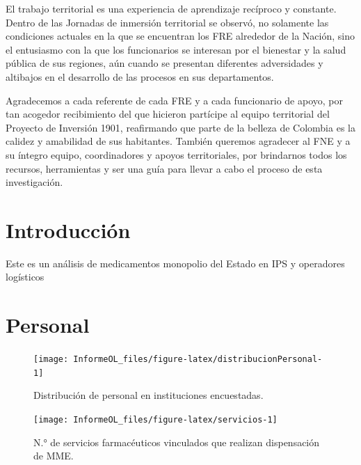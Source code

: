 \documentclass[
  oneside]{book}
\begin{document}
El trabajo territorial es una experiencia de aprendizaje recíproco y constante. Dentro de las Jornadas de inmersión territorial se observó, no solamente las condiciones actuales en la que se encuentran los FRE alrededor de la Nación, sino el entusiasmo con la que los funcionarios se interesan por el bienestar y la salud pública de sus regiones, aún cuando se presentan diferentes adversidades y altibajos en el desarrollo de las procesos en sus departamentos.

Agradecemos a cada referente de cada FRE y a cada funcionario de apoyo, por tan acogedor recibimiento del que hicieron partícipe al equipo territorial del Proyecto de Inversión 1901, reafirmando que parte de la belleza de Colombia es la calidez y amabilidad de sus habitantes. También queremos agradecer al FNE y a su íntegro equipo, coordinadores y apoyos territoriales, por brindarnos todos los recursos, herramientas y ser una guía para llevar a cabo el proceso de esta investigación.

\hypertarget{introducciuxf3n}{%
\chapter{Introducción}\label{introducciuxf3n}}

Este es un análisis de medicamentos monopolio del Estado en IPS y operadores logísticos

\hypertarget{personal}{%
\chapter{Personal}\label{personal}}


\begin{figure}

{\centering \texttt{[image: InformeOL\_files/figure-latex/distribucionPersonal-1]} 

}

\caption{Distribución de personal en instituciones encuestadas.}\label{fig:distribucionPersonal}
\end{figure}

\begin{figure}

{\centering \texttt{[image: InformeOL\_files/figure-latex/servicios-1]} 

}

\caption{N.° de servicios farmacéuticos vinculados que realizan dispensación de MME.}\label{fig:servicios}
\end{figure}
\end{document}
